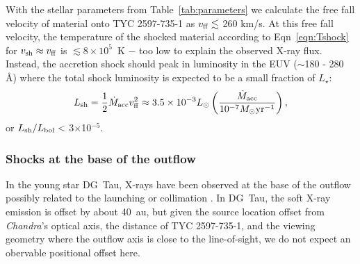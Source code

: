 \documentclass[linenumbers]{aastex631}
\begin{document}
With the stellar parameters from Table~\ref{tab:parameters} we calculate the free fall velocity of material onto TYC 2597-735-1 as
$v_{\rm ff} \lesssim$ 260 km/s. At this free fall velocity, the temperature of the shocked material according to Eqn~\ref{eqn:Tshock} for $v_{\rm sh} \approx v_{\rm ff}$ is $\lesssim8\times 10^5$~K $-$ too low to explain the observed X-ray flux.
Instead, the accretion shock should peak in luminosity in the EUV ($\sim$180 - 280 {\AA}) where the total shock luminosity is expected to be a small fraction of $L_{\star}$:
\begin{equation}
    L_{\rm sh} = \frac{1}{2} \dot{M}_{\rm acc} v_{\rm ff}^{2} \approx 3.5 \times 10^{-3} L_{\odot}\left(\frac{\dot{M}_{\rm acc}}{10^{-7}M_{\odot}{\rm yr^{-1}}}\right),
\end{equation}
or $L_{\rm sh}/L_{\rm bol} <$ 3$\times$10$^{-5}$.

\subsubsection{Shocks at the base of the outflow}
\label{sect:baseoutflow}
In the young star DG~Tau, X-rays have been observed at the base of the outflow \citep{2008A&A...488L..13S} possibly related to the launching or collimation \citep[e.g.][]{2014ApJ...795...51G,2018A&A...615A.124U}. In DG~Tau, the soft X-ray emission is offset by about 40~au, but given the source location offset from \emph{Chandra}'s optical axis, the distance of TYC 2597-735-1, and the viewing geometry where the outflow axis is close to the line-of-sight, we do not expect an obervable positional offset here.
\end{document}
